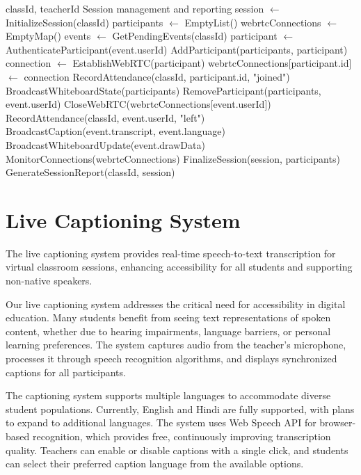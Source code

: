 \documentclass[onecolumn]{IEEEtran}
\begin{document}
\begin{algorithm}
\caption{Virtual Classroom Session Management}
\begin{algorithmic}[1]
\REQUIRE classId, teacherId
\ENSURE Session management and reporting
\STATE session $\leftarrow$ InitializeSession(classId)
\STATE participants $\leftarrow$ EmptyList()
\STATE webrtcConnections $\leftarrow$ EmptyMap()
\STATE events $\leftarrow$ GetPendingEvents(classId)
\STATE participant $\leftarrow$ AuthenticateParticipant(event.userId)
\STATE AddParticipant(participants, participant)
\STATE connection $\leftarrow$ EstablishWebRTC(participant)
\STATE webrtcConnections[participant.id] $\leftarrow$ connection
\STATE RecordAttendance(classId, participant.id, "joined")
\STATE BroadcastWhiteboardState(participants)
\STATE RemoveParticipant(participants, event.userId)
\STATE CloseWebRTC(webrtcConnections[event.userId])
\STATE RecordAttendance(classId, event.userId, "left")
\STATE BroadcastCaption(event.transcript, event.language)
\STATE BroadcastWhiteboardUpdate(event.drawData)
\ENDIF
\ENDFOR
\STATE MonitorConnections(webrtcConnections)
\ENDWHILE
\STATE FinalizeSession(session, participants)
\STATE GenerateSessionReport(classId, session)
\end{algorithmic}
\end{algorithm}

\section{Live Captioning System}

The live captioning system provides real-time speech-to-text transcription for virtual classroom sessions, enhancing accessibility for all students and supporting non-native speakers.

Our live captioning system addresses the critical need for accessibility in digital education. Many students benefit from seeing text representations of spoken content, whether due to hearing impairments, language barriers, or personal learning preferences. The system captures audio from the teacher's microphone, processes it through speech recognition algorithms, and displays synchronized captions for all participants.

The captioning system supports multiple languages to accommodate diverse student populations. Currently, English and Hindi are fully supported, with plans to expand to additional languages. The system uses Web Speech API for browser-based recognition, which provides free, continuously improving transcription quality. Teachers can enable or disable captions with a single click, and students can select their preferred caption language from the available options.
\end{document}
